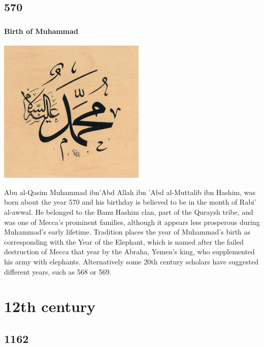 \documentclass[11pt]{report}
\begin{document}
\chapter{570}
\section{}
\subsection{Birth of Muhammad}
\vspace{2mm}\begin{center}\includegraphics[width=7cm]{./img/muhammad.jpg}\end{center}
Abu al-Qasim Muhammad ibn'Abd Allah ibn 'Abd al-Muttalib ibn Hashim, was born about the year 570 and his birthday is believed to be in the month of Rabi' al-awwal. He belonged to the Banu Hashim clan, part of the Quraysh tribe, and was one of Mecca's prominent families, although it appears less prosperous during Muhammad's early lifetime. Tradition places the year of Muhammad's birth as corresponding with the Year of the Elephant, which is named after the failed destruction of Mecca that year by the Abraha, Yemen's king, who supplemented his army with elephants. Alternatively some 20th century scholars have suggested different years, such as 568 or 569.

										
	
\part{12th century}
\chapter{1162}
\section{}
\end{document}
